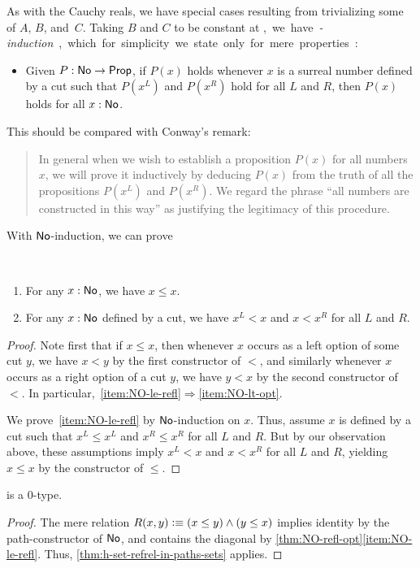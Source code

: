 As with the Cauchy reals, we have special cases resulting from trivializing some of $A$, $B$, and~$C$.
Taking $B$ and $C$ to be constant at \unit, we have \emph{\NO-induction}, which for simplicity we state only for mere properties:
\begin{itemize}
\item Given $P:\mathsf{No}\to\mathsf{Prop}$, if $P(x)$ holds whenever $x$ is a surreal number defined by a cut such that $P(x^L)$ and $P(x^R)$ hold for all
$L$ and $R$, then $P(x)$ holds for all $x:\mathsf{No}$.
\end{itemize}
This should be compared with Conway's remark:
\begin{quote}\footnotesize
  In general when we wish to establish a proposition $P(x)$ for all numbers $x$, we will prove it inductively by deducing $P(x)$ from the truth of all the propositions $P(x^L)$ and $P(x^R)$.
  We regard the phrase ``all numbers are constructed in this way'' as justifying the legitimacy of this procedure.
\end{quote}
With $\mathsf{No}$-induction, we can prove

\begin{thm}\label{thm:NO-refl-opt}\ 
  \begin{enumerate}
  \item For any $x:\mathsf{No}$, we have $x\le x$.\label{item:NO-le-refl}
  \item For any $x:\mathsf{No}$ defined by a cut, we have $x^L <x$ and $x<x^R$ for all $L$ and $R$.\label{item:NO-lt-opt}
  \end{enumerate}
\end{thm}
\begin{proof}
  Note first that if $x\le x$, then whenever $x$ occurs as a left option of some cut $y$, we have $x<y$ by the first constructor of $<$, and similarly whenever $x$ occurs as a right option of a cut $y$, we have $y<x$ by the second constructor of $<$.
  In particular,~\ref{item:NO-le-refl}$\Rightarrow$\ref{item:NO-lt-opt}.

  We prove~\ref{item:NO-le-refl} by $\mathsf{No}$-induction on $x$.
  Thus, assume $x$ is defined by a cut such that $x^L\le x^L$ and $x^R \le x^R$ for all $L$ and $R$.
  But by our observation above, these assumptions imply $x^L<x$ and $x<x^R$ for all $L$ and $R$, yielding $x\le x$ by the constructor of $\le$.
\end{proof}

\begin{cor}\label{thm:NO-set}
  \NO is a 0-type.
\end{cor}
\begin{proof}
  The mere relation $R(x,y)\vcentcolon\equiv (x\le y) \land (y\le x)$ implies identity by the path-constructor of $\mathsf{No}$, and contains the diagonal by \autoref{thm:NO-refl-opt}\ref{item:NO-le-refl}.
  Thus, \autoref{thm:h-set-refrel-in-paths-sets} applies.
\end{proof}

